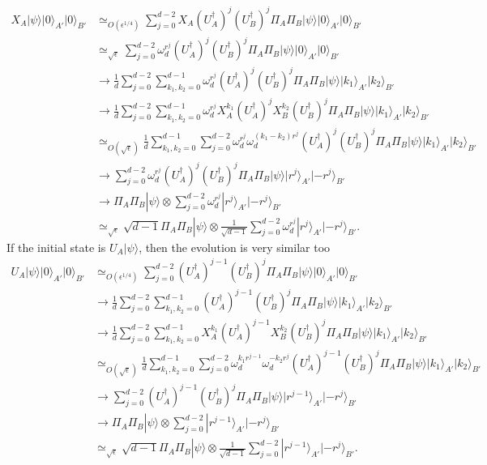 \documentclass[11pt,letterpaper]{article}
\newcommand{\ket}[1]{|#1\rangle}
\newcommand{\x}{\otimes}
\newcommand{\ct}{^{\dagger}}
\newcommand{\1}{\mathbb{1}}
\newcommand{\appd}[1]{\simeq_{#1}}
\theoremstyle{definition}
\begin{document}
\begin{align}
	X_A \ket{\psi} \ket{0}_{A'}\ket{0}_{B'} &\appd{O(\epsilon^{1/4})} 
		\sum_{j=0}^{d-2} X_A(U_A\ct)^j (U_B\ct)^j\Pi_A \Pi_B \ket{\psi} \ket{0}_{A'}\ket{0}_{B'}\\
		&\appd{\sqrt{\epsilon}} \sum_{j=0}^{d-2} \omega_d^{r^j}(U_A\ct)^j (U_B\ct)^j\Pi_A \Pi_B \ket{\psi} \ket{0}_{A'}\ket{0}_{B'}\\
		&\to\frac{1}{d}\sum_{j=0}^{d-2} \sum_{k_1,k_2 = 0}^{d-1} \omega_d^{r^j} (U_A\ct)^j (U_B\ct)^j\Pi_A \Pi_B \ket{\psi} \ket{k_1}_{A'}\ket{k_2}_{B'}\\
		&\to\frac{1}{d}\sum_{j=0}^{d-2}\sum_{k_1,k_2 = 0}^{d-1} 
		\omega_d^{r^j} X_A^{k_1}(U_A\ct)^j X_B^{k_2}(U_B\ct)^j\Pi_A \Pi_B\ket{\psi} \ket{k_1}_{A'}\ket{k_2}_{B'}\\
		&\appd{O(\sqrt{\epsilon})} \frac{1}{d}\sum_{k_1,k_2 = 0}^{d-1} \sum_{j=0}^{d-2} \omega_d^{r^j}\omega_d^{(k_1-k_2)r^j}(U_A\ct)^j(U_B\ct)^j\Pi_A \Pi_B \ket{\psi} \ket{k_1}_{A'}\ket{k_2}_{B'}\\
		&\to  \sum_{j=0}^{d-2} \omega_d^{r^j} (U_A\ct)^j(U_B\ct)^j\Pi_A \Pi_B \ket{\psi} \ket{r^j}_{A'}\ket{-r^j}_{B'}\\
		&\to  \Pi_A \Pi_B \ket{\psi} \x  \sum_{j=0}^{d-2} \omega_d^{r^j}\ket{r^j}_{A'}\ket{-r^j}_{B'}\\
		&\appd{\sqrt{\epsilon}} \sqrt{d-1}\Pi_A \Pi_B \ket{\psi} \x \frac{1}{\sqrt{d-1}} \sum_{j=0}^{d-2} \omega_d^{r^j} \ket{r^j}_{A'}\ket{-r^j}_{B'}.
\end{align}
If the initial state is $U_A\ket{\psi}$, then the evolution is very similar too
\begin{align}
	U_A \ket{\psi} \ket{0}_{A'}\ket{0}_{B'} &\appd{O(\epsilon^{1/4})} 
		\sum_{j=0}^{d-2} (U_A\ct)^{j-1} (U_B\ct)^j\Pi_A \Pi_B \ket{\psi} \ket{0}_{A'}\ket{0}_{B'}\\
		&\to\frac{1}{d}\sum_{j=0}^{d-2} \sum_{k_1,k_2 = 0}^{d-1} (U_A\ct)^{j-1} (U_B\ct)^j\Pi_A \Pi_B \ket{\psi} \ket{k_1}_{A'}\ket{k_2}_{B'}\\
		&\to\frac{1}{d}\sum_{j=0}^{d-2}\sum_{k_1,k_2 = 0}^{d-1} 
		X_A^{k_1}(U_A\ct)^{j-1} X_B^{k_2}(U_B\ct)^j\Pi_A \Pi_B\ket{\psi} \ket{k_1}_{A'}\ket{k_2}_{B'}\\
		&\appd{O(\sqrt{\epsilon})} \frac{1}{d}\sum_{k_1,k_2 = 0}^{d-1} \sum_{j=0}^{d-2} \omega_d^{k_1r^{j-1}}\omega_d^{-k_2r^j}(U_A\ct)^{j-1}(U_B\ct)^j\Pi_A \Pi_B \ket{\psi} \ket{k_1}_{A'}\ket{k_2}_{B'}\\
		&\to  \sum_{j=0}^{d-2} (U_A\ct)^{j-1}(U_B\ct)^j\Pi_A \Pi_B \ket{\psi} \ket{r^{j-1}}_{A'}\ket{-r^j}_{B'}\\
		&\to  \Pi_A \Pi_B \ket{\psi} \x  \sum_{j=0}^{d-2} \ket{r^{j-1}}_{A'}\ket{-r^j}_{B'}\\
		&\appd{\sqrt{\epsilon}} \sqrt{d-1}\Pi_A \Pi_B \ket{\psi} \x \frac{1}{\sqrt{d-1}} \sum_{j=0}^{d-2} \ket{r^{j-1}}_{A'}\ket{-r^j}_{B'}.
\end{align}
\end{document}
